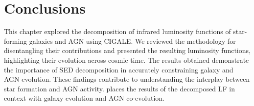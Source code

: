 \section{Conclusions}

This chapter explored the decomposition of infrared luminosity functions of star-forming galaxies and AGN using CIGALE. We reviewed the methodology for disentangling their contributions and presented the resulting luminosity functions, highlighting their evolution across cosmic time. The results obtained demonstrate the importance of SED decomposition in accurately constraining galaxy and AGN evolution. These findings contribute to understanding the interplay between star formation and AGN activity.  places the results of the decomposed LF in context with galaxy evolution and AGN co-evolution.
